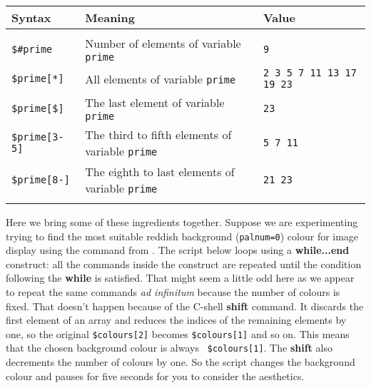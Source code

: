 \documentclass[twoside,11pt,nolof]{starlink}
\providecommand{\KAPPAref}{\xref{{\footnotesize KAPPA}}{sun95}{}}
\begin{document}
\begin{center}
\begin{tabular}{lp{80mm}l}
Syntax            & Meaning                    & Value \\ \hline
\\
\texttt{\$\#prime}   & Number of elements of variable \texttt{prime} & \texttt{9} \\
\texttt{\$prime[*]}  & All elements of variable \texttt{prime} & \texttt{2 3 5 7 11 13
                                                           17 19 23} \\
\texttt{\$prime[\$]} & The last element of variable \texttt{prime} & \texttt{23} \\
\texttt{\$prime[3-5]} & The third to fifth elements of variable \texttt{prime} &
                                                           \texttt{5 7 11} \\
\texttt{\$prime[8-]} & The eighth to last elements of variable \texttt{prime} &
                                                           \texttt{21 23} \\
\\ \hline
\end{tabular}
\end{center}
\bigskip

Here we bring some of these ingredients together.  Suppose we are
experimenting trying to find the most suitable reddish background
({\texttt{palnum=0}}) colour for image display using the
 command
from \KAPPAref\@.  The script below loops using a \textbf{while...end}
construct: all the commands inside the construct are repeated until the
condition following the \textbf{while} is satisfied.  That might seem a
little odd here as we appear to repeat the same commands \emph{ad
infinitum} because the number of colours is fixed.  That doesn't happen
because of the C-shell \textbf{shift} command.  It discards the first
element of an array and reduces the indices of the remaining elements by
one, so the original \texttt{\$colours[2]} becomes \texttt{\$colours[1]} and
so on.  This means that the chosen background colour is always {\tt
\$colours[1]}.  The \textbf{shift} also decrements the number of colours by
one.  So the script changes the background colour and pauses for five
seconds for you to consider the aesthetics.

\begin{small}
\end{small}
\end{document}
